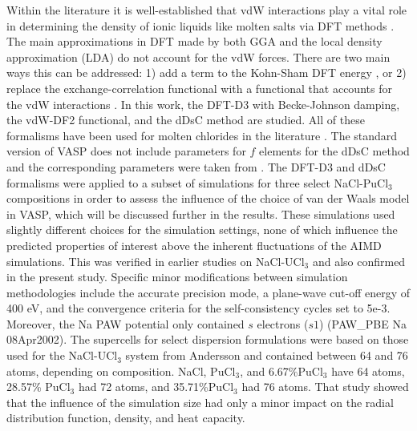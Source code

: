 \documentclass[review]{elsarticle}
\begin{document}
Within the literature it is well-established that vdW interactions play a vital role in determining the density of ionic liquids like molten salts via DFT methods \cite{NAM2015224, Bengston2014, duemmler_liclkcl, duemmler_naclmgcl, ANDERSSON2022153836}. The main approximations in DFT made by both GGA and the local density approximation (LDA) do not account for the vdW forces. There are two main ways this can be addressed: 1) add a term to the Kohn-Sham DFT energy \cite{Grimme2006, Grimme2010}, or 2) replace the exchange-correlation functional with a functional that accounts for the vdW interactions \cite{Dion2004}. In this work, the DFT-D3 with Becke-Johnson damping, the vdW-DF2 functional, and the dDsC method are studied. All of these formalisms have been used for molten chlorides in the literature \cite{li2021molecular, duemmler_liclkcl, duemmler_naclmgcl, Dion2004, ANDERSSON2022153836}. The standard version of VASP does not include parameters for $f$ elements for the dDsC method and the corresponding parameters were taken from \cite{kim2012universal, schwerdtfeger2019table}. The DFT-D3 and dDsC formalisms were applied to a subset of simulations for three select NaCl-PuCl$_3$ compositions in order to assess the influence of the choice of van der Waals model in VASP, which will be discussed further in the results. These simulations used slightly different choices for the simulation settings, none of which influence the predicted properties of interest above the inherent fluctuations of the AIMD simulations. This was verified in earlier studies on NaCl-UCl$_3$ \cite{ANDERSSON2022153836} and also confirmed in the present study. Specific minor modifications between simulation methodologies include the accurate precision mode, a plane-wave cut-off energy of 400 eV, and the convergence criteria for the self-consistency cycles set to 5e-3. Moreover, the Na PAW potential only contained $s$ electrons ($s1$) (PAW\_PBE Na 08Apr2002). The supercells for select dispersion formulations were based on those used for the NaCl-UCl$_3$ system from Andersson \cite{ANDERSSON2022153836} and contained between 64 and 76 atoms, depending on composition. NaCl, PuCl$_3$, and 6.67\%PuCl$_3$ have 64 atoms, 28.57\% PuCl$_3$ had 72 atoms, and 35.71\%PuCl$_3$ had 76 atoms. That study showed that the influence of the simulation size had only a minor impact on the radial distribution function, density, and heat capacity. 
\end{document}
